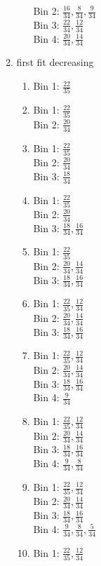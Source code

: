 \documentclass[11pt]{article}
\begin{document}
\begin{enumerate}
\begin{enumerate}
\begin{enumerate}
Bin 2: $\frac{16}{34}, \frac{8}{34}, \frac{9}{34}$\\
Bin 3: $\frac{22}{34}, \frac{12}{34}$\\
Bin 4: $\frac{20}{34}, \frac{14}{34}$\\
\end{enumerate}
\item first fit decreasing
\begin{enumerate}
\item Bin 1: $\frac{22}{35}$
\item Bin 1: $\frac{22}{35}$\\
Bin 2: $\frac{20}{34}$
\item Bin 1: $\frac{22}{35}$\\
Bin 2: $\frac{20}{34}$\\
Bin 3: $\frac{18}{34}$
\item Bin 1: $\frac{22}{35}$\\
Bin 2: $\frac{20}{34}$\\
Bin 3: $\frac{18}{34}, \frac{16}{34}$
\item Bin 1: $\frac{22}{35}$\\
Bin 2: $\frac{20}{34}, \frac{14}{34}$\\
Bin 3: $\frac{18}{34}, \frac{16}{34}$
\item Bin 1: $\frac{22}{35}, \frac{12}{34}$\\
Bin 2: $\frac{20}{34}, \frac{14}{34}$\\
Bin 3: $\frac{18}{34}, \frac{16}{34}$
\item Bin 1: $\frac{22}{35}, \frac{12}{34}$\\
Bin 2: $\frac{20}{34}, \frac{14}{34}$\\
Bin 3: $\frac{18}{34}, \frac{16}{34}$\\
Bin 4: $\frac{9}{34}$
\item Bin 1: $\frac{22}{35}, \frac{12}{34}$\\
Bin 2: $\frac{20}{34}, \frac{14}{34}$\\
Bin 3: $\frac{18}{34}, \frac{16}{34}$\\
Bin 4: $\frac{9}{34}, \frac{8}{34}$
\item Bin 1: $\frac{22}{35}, \frac{12}{34}$\\
Bin 2: $\frac{20}{34}, \frac{14}{34}$\\
Bin 3: $\frac{18}{34}, \frac{16}{34}$\\
Bin 4: $\frac{9}{34}, \frac{8}{34}, \frac{5}{34}$
\item Bin 1: $\frac{22}{35}, \frac{12}{34}$\\

\end{enumerate}
\end{enumerate}
\end{enumerate}
\end{document}
